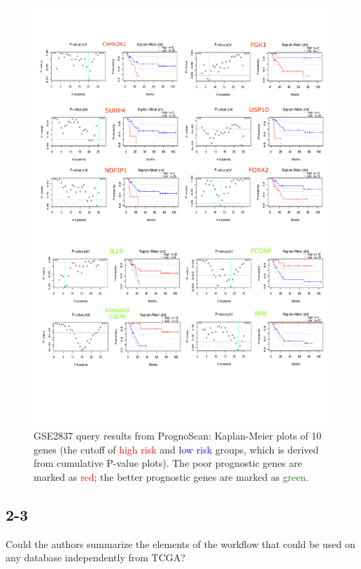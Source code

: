 \documentclass[preprint,12pt]{elsarticle}
\newenvironment{MyColorPar}[1]{%
    \leavevmode\color{#1}\ignorespaces%
}{%
}%
\begin{document}
\begin{MyColorPar}{blue}
\begin{figure}
\raggedleft
\includegraphics[width=14cm]{Answer_2-2.pdf}
\caption{GSE2837 query results from PrognoScan: Kaplan-Meier plots of 10 genes (the cutoff of \textcolor{red}{high risk} and \textcolor{blue}{low risk} groups, which is derived from cumulative P-value plots). The poor prognostic genes are marked as \textcolor{red}{red}; the better prognostic genes are marked as \textcolor{green}{green}.}
\label{figure:fig_GSE2837}
\end{figure}
\clearpage
\end{MyColorPar}

\subsection*{2-3}
Could the authors summarize the elements of the workflow that could be used on any database independently from TCGA?
\end{document}
